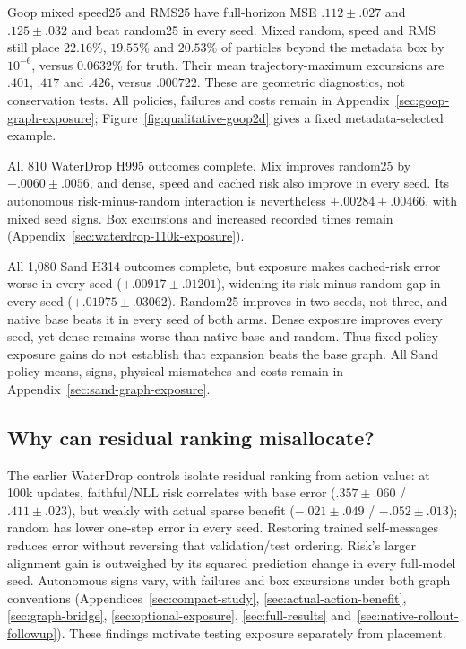Goop mixed speed25 and RMS25 have full-horizon MSE $.112\pm.027$ and $.125\pm.032$ and beat random25 in every seed. Mixed random, speed and RMS still place $22.16\%$, $19.55\%$ and $20.53\%$ of particles beyond the metadata box by $10^{-6}$, versus $0.0632\%$ for truth. Their mean trajectory-maximum excursions are $.401$, $.417$ and $.426$, versus $.000722$. These are geometric diagnostics, not conservation tests. All policies, failures and costs remain in Appendix~\ref{sec:goop-graph-exposure}; Figure~\ref{fig:qualitative-goop2d} gives a fixed metadata-selected example.

All 810 WaterDrop H995 outcomes complete. Mix improves random25 by $-.0060\pm.0056$, and dense, speed and cached risk also improve in every seed. Its autonomous risk-minus-random interaction is nevertheless $+.00284\pm.00466$, with mixed seed signs. Box excursions and increased recorded times remain (Appendix~\ref{sec:waterdrop-110k-exposure}).

All 1,080 Sand H314 outcomes complete, but exposure makes cached-risk error worse in every seed ($+.00917\pm.01201$), widening its risk-minus-random gap in every seed ($+.01975\pm.03062$). Random25 improves in two seeds, not three, and native base beats it in every seed of both arms. Dense exposure improves every seed, yet dense remains worse than native base and random. Thus fixed-policy exposure gains do not establish that expansion beats the base graph. All Sand policy means, signs, physical mismatches and costs remain in Appendix~\ref{sec:sand-graph-exposure}.

\subsection{Why can residual ranking misallocate?}
The earlier WaterDrop controls isolate residual ranking from action value: at 100k updates, faithful/NLL risk correlates with base error ($.357\pm.060$ / $.411\pm.023$), but weakly with actual sparse benefit ($-.021\pm.049$ / $-.052\pm.013$); random has lower one-step error in every seed. Restoring trained self-messages reduces error without reversing that validation/test ordering. Risk's larger alignment gain is outweighed by its squared prediction change in every full-model seed. Autonomous signs vary, with failures and box excursions under both graph conventions (Appendices~\ref{sec:compact-study}, \ref{sec:actual-action-benefit}, \ref{sec:graph-bridge}, \ref{sec:optional-exposure}, \ref{sec:full-results} and~\ref{sec:native-rollout-followup}). These findings motivate testing exposure separately from placement.

